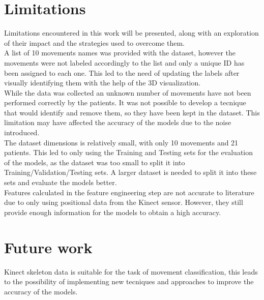     \section{Limitations}

        Limitations encountered in this work will be presented, along with an exploration of their impact and the strategies used to overcome them. \\

        A list of 10 movements names was provided with the dataset, however the movements were not labeled accordingly to the list and only a unique ID has been assigned to each one. This led to the need of updating the labels after visually identifying them with the help of the 3D visualization. \\
        While the data was collected an unknown number of movements have not been performed correctly by the patients. It was not possible to develop a tecnique that would identify and remove them, so they have been kept in the dataset. This limitation may have affected the accuracy of the models due to the noise introduced.\\

        The dataset dimensions is relatively small, with only 10 movements and 21 patients. This led to only using the Training and Testing sets for the evaluation of the models, as the dataset was too small to split it into Training/Validation/Testing sets. A larger dataset is needed to split it into these sets and evaluate the models better. \\
        Features calculated in the feature engineering step are not accurate to literature due to only using positional data from the Kinect sensor. However, they still provide enough information for the models to obtain a high accuracy.

    \section{Future work}      

        Kinect skeleton data is suitable for the task of movement classification, this leads to the possibility of implementing new tecniques and approaches to improve the accuracy of the models. \\

